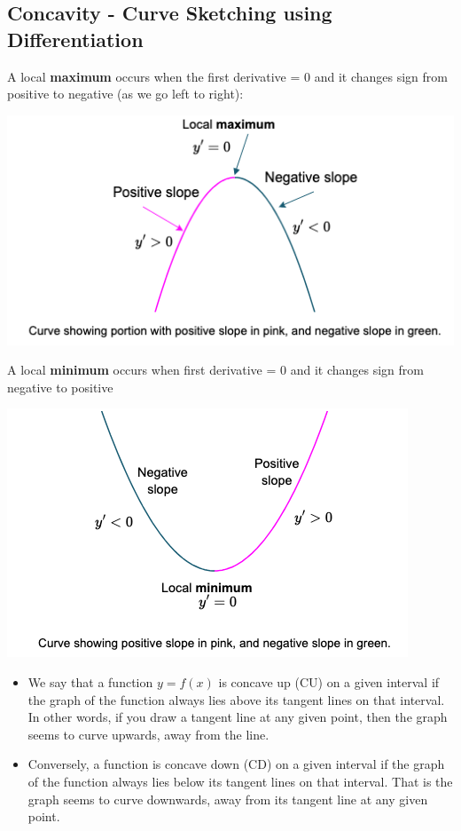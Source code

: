 \documentclass{book}
\begin{document}
	
	\subsection{Concavity - Curve Sketching using Differentiation}
	
	A local \textbf{maximum} occurs when the first derivative = 0 and it changes sign from positive to negative (as we go left to right):
	
	\includegraphics[scale=0.5]{localmaximum}
	
	A local \textbf{minimum} occurs when first derivative = 0 and it changes sign from negative to positive
	
	\includegraphics[scale=0.5]{localminimum}
	
	\begin{itemize}
		\item We say that a function $y = f(x)$ is concave up (CU) on a given interval if the graph of the function always lies above its tangent lines on that interval. In other words, if you draw a tangent line at any given point, then the graph seems to curve upwards, away from the line.
		\item Conversely, a function is concave down (CD) on a given interval if the graph of the function always lies below its tangent lines on that interval. That is the graph seems to curve downwards, away from its tangent line at any given point.
	\end{itemize}
	
\end{document}
